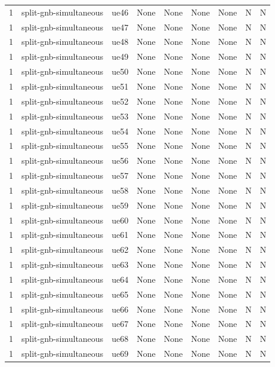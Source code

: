 \begin{table}[ht]
\begin{tabular}{|c|c|c|c|c|c|c|c|c|}
1 & split-gnb-simultaneous & ue46 & None & None & None & None & N & N \\
1 & split-gnb-simultaneous & ue47 & None & None & None & None & N & N \\
1 & split-gnb-simultaneous & ue48 & None & None & None & None & N & N \\
1 & split-gnb-simultaneous & ue49 & None & None & None & None & N & N \\
1 & split-gnb-simultaneous & ue50 & None & None & None & None & N & N \\
1 & split-gnb-simultaneous & ue51 & None & None & None & None & N & N \\
1 & split-gnb-simultaneous & ue52 & None & None & None & None & N & N \\
1 & split-gnb-simultaneous & ue53 & None & None & None & None & N & N \\
1 & split-gnb-simultaneous & ue54 & None & None & None & None & N & N \\
1 & split-gnb-simultaneous & ue55 & None & None & None & None & N & N \\
1 & split-gnb-simultaneous & ue56 & None & None & None & None & N & N \\
1 & split-gnb-simultaneous & ue57 & None & None & None & None & N & N \\
1 & split-gnb-simultaneous & ue58 & None & None & None & None & N & N \\
1 & split-gnb-simultaneous & ue59 & None & None & None & None & N & N \\
1 & split-gnb-simultaneous & ue60 & None & None & None & None & N & N \\
1 & split-gnb-simultaneous & ue61 & None & None & None & None & N & N \\
1 & split-gnb-simultaneous & ue62 & None & None & None & None & N & N \\
1 & split-gnb-simultaneous & ue63 & None & None & None & None & N & N \\
1 & split-gnb-simultaneous & ue64 & None & None & None & None & N & N \\
1 & split-gnb-simultaneous & ue65 & None & None & None & None & N & N \\
1 & split-gnb-simultaneous & ue66 & None & None & None & None & N & N \\
1 & split-gnb-simultaneous & ue67 & None & None & None & None & N & N \\
1 & split-gnb-simultaneous & ue68 & None & None & None & None & N & N \\
1 & split-gnb-simultaneous & ue69 & None & None & None & None & N & N \\

\end{tabular}
\end{table}
